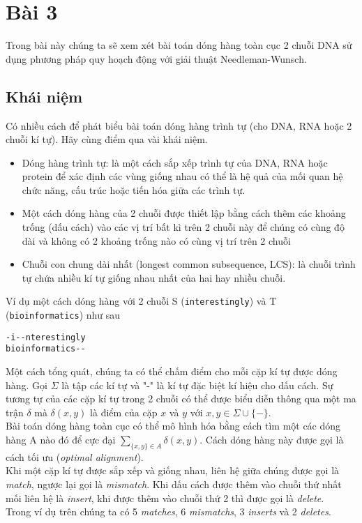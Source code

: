 \section{Bài 3}
Trong bài này chúng ta sẽ xem xét bài toán dóng hàng
toàn cục 2 chuỗi DNA sử dụng phương pháp quy hoạch động 
với giải thuật Needleman-Wunsch.

\subsection{Khái niệm}
Có nhiều cách để phát biểu bài toán dóng hàng trình tự 
(cho DNA, RNA hoặc 2 chuỗi kí tự). Hãy cùng điểm qua vài khái niệm.

\begin{itemize}
    \item Dóng hàng trình tự: là một cách sắp xếp trình tự của DNA,
    RNA hoặc protein để xác định các vùng giống nhau có thể là
    hệ quả của mối quan hệ chức năng, cấu trúc hoặc tiến hóa giữa
    các trình tự.
    \item Một cách dóng hàng của 2 chuỗi được thiết lập bằng cách thêm
    các khoảng trống (dấu cách) vào các vị trí bất kì trên 2 chuỗi này
    để chúng có cùng độ dài và không có 2 khoảng trống nào có cùng vị trí 
    trên 2 chuỗi
    \item Chuỗi con chung dài nhất (longest common subsequence, LCS):
    là chuỗi trình tự chứa nhiều kí tự giống nhau nhất của hai hay
    nhiều chuỗi.
\end{itemize}
Ví dụ một cách dóng hàng với 2 chuỗi S (\lstinline{interestingly}) 
và T (\lstinline{bioinformatics}) như sau
\begin{center}
    \lstinline{-i--nterestingly} \\
    \lstinline{bioinformatics--}
\end{center}

Một cách tổng quát, chúng ta có thể chấm điểm cho mỗi cặp kí tự được dóng hàng.
Gọi $\Sigma$ là tập các kí tự và "-" là kí tự đặc biệt kí hiệu cho dấu cách. 
Sự tương tự của các cặp kí tự trong 2 chuỗi có thể được biểu diễn thông qua 
một ma trận $\delta$ mà $\delta(x,y)$ là điểm của cặp $x$ và $y$ với 
$x, y \in \Sigma \cup \{-\}$. \\
Bài toán dóng hàng toàn cục có thể mô hình hóa bằng cách tìm một các dóng hàng A
nào đó để cực đại $\sum_{\{x, y \} \in A} \delta(x,y)$. Cách dóng hàng này được
gọi là cách tối ưu (\textit{optimal alignment}). \\
Khi một cặp kí tự được sắp xếp và giống nhau, liên hệ giữa chúng
 được gọi là \textit{match}, ngược
lại gọi là \textit{mismatch}. Khi dấu cách được thêm vào chuỗi thứ nhất mối liên hệ 
là \textit{insert}, khi được thêm vào chuỗi thứ 2 thì được gọi là \textit{delete}. \\
Trong ví dụ trên chúng ta có 5 \textit{matches}, 6 \textit{mismatchs}, 3 \textit{inserts}
và 2 \textit{deletes}.

